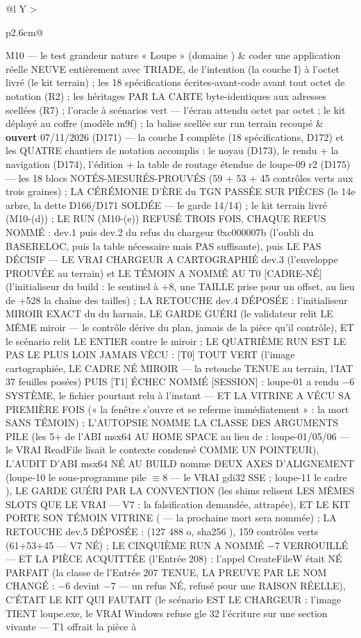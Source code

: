 \begin{table}[htbp]
\begin{tabularx}{\textwidth}{@{}l Y >{\raggedright\arraybackslash}p{2.6cm}@{}}
M10 — le test grandeur nature « Loupe » (domaine ) & coder une application réelle NEUVE entièrement avec TRIADE, de l'intention (la couche I) à l'octet livré (le kit terrain) ; les 18 spécifications écrites-avant-code avant tout octet de notation (R2) ; les héritages PAR LA CARTE byte-identiques aux adresses scellées (R7) ; l'oracle à scénarios vert — l'écran attendu octet par octet ; le kit déployé au coffre  (modèle m9f) ; la balise  scellée sur run terrain recoupé & \textbf{ouvert} 07/11/2026 (D171) — la couche I complète (18 spécifications, D172) et les QUATRE chantiers de notation accomplis : le noyau (D173), le rendu + la navigation (D174), l'édition + la table de routage étendue de loupe-09 r2 (D175) — les 18 blocs NOTÉS-MESURÉS-PROUVÉS (59 + 53 + 45 contrôles verts aux trois graines) ; LA CÉRÉMONIE D'ÈRE du TGN PASSÉE SUR PIÈCES (le 14e arbre, la dette D166/D171 SOLDÉE — le garde 14/14) ; le kit terrain livré (M10-(d)) ; LE RUN (M10-(e)) REFUSÉ TROIS FOIS, CHAQUE REFUS NOMMÉ : dev.1 puis dev.2 du refus du chargeur 0xc000007b (l'oubli du BASERELOC, puis la table nécessaire mais PAS suffisante), puis LE PAS DÉCISIF — LE VRAI CHARGEUR A CARTOGRAPHIÉ dev.3 (l'enveloppe PROUVÉE au terrain) et LE TÉMOIN A NOMMÉ AU T0 [CADRE-NÉ] (l'initialiseur du build : le sentinel à +8, une TAILLE prise pour un offset, au lieu de +528 la chaîne des tailles) ; LA RETOUCHE dev.4 DÉPOSÉE : l'initialiseur  MIROIR EXACT du  du harnais, LE GARDE GUÉRI (le validateur relit LE MÊME miroir — le contrôle dérive du plan, jamais de la pièce qu'il contrôle), ET le scénario relit LE  ENTIER contre le miroir ; LE QUATRIÈME RUN EST LE PAS LE PLUS LOIN JAMAIS VÊCU : [T0] TOUT VERT (l'image cartographiée, LE CADRE NÉ MIROIR — la retouche TENUE au terrain, l'IAT 37 feuilles posées) PUIS [T1] ÉCHEC NOMMÉ [SESSION] : loupe-01 a rendu $-6$ SYSTÈME, le fichier pourtant relu à l'instant — ET LA VITRINE A VÉCU SA PREMIÈRE FOIS (« la fenêtre s'ouvre et se referme immédiatement » : la mort SANS TÉMOIN) ; L'AUTOPSIE NOMME LA CLASSE DES ARGUMENTS PILE (les 5+ de l'ABI msx64 AU HOME SPACE au lieu de \code{[rsp+0x20]+} : loupe-01/05/06 — le VRAI ReadFile lisait le contexte condensé COMME UN POINTEUR), L'AUDIT D'ABI msx64 NÉ AU BUILD nomme DEUX AXES D'ALIGNEMENT (loupe-10 le sous-programme  pile $\equiv 8$ — le VRAI gdi32 SSE ; loupe-11 le cadre ), LE GARDE GUÉRI PAR LA CONVENTION (les shims relisent LES MÊMES SLOTS QUE LE VRAI — V7 : la falsification demandée, attrapée), ET LE KIT PORTE SON TÉMOIN VITRINE ( — la prochaine mort sera nommée) ; LA RETOUCHE dev.5 DÉPOSÉE :  (127 488 o, sha256 ), 159 contrôles verts (61+53+45 — V7 NÉ) ; LE CINQUIÈME RUN A NOMMÉ $-7$ VERROUILLÉ — ET LA PIÈCE ACQUITTÉE (l'Entrée 208) : l'appel CreateFileW était NÉ PARFAIT (la classe de l'Entrée 207 TENUE, LA PREUVE PAR LE NOM CHANGÉ : $-6$ devint $-7$ — un refus NÉ, refusé pour une RAISON RÉELLE), C'ÉTAIT LE KIT QUI FAUTAIT (le scénario EST LE CHARGEUR : l'image TIENT loupe.exe, le VRAI Windows refuse gle 32 l'écriture sur une section vivante — T1 offrait la pièce à 
\end{tabularx}
\end{table}
